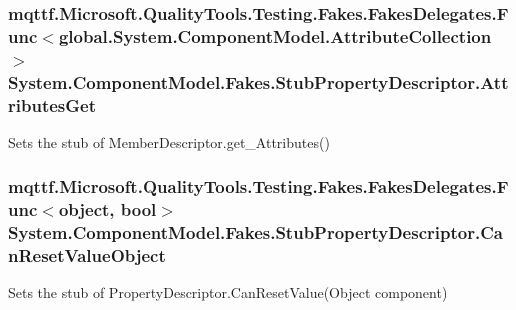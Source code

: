 \hypertarget{class_system_1_1_component_model_1_1_fakes_1_1_stub_property_descriptor_a8dfef55ee32a13c8420eb5f97480d707}{
\subsubsection[{Attributes\-Get}]{\setlength{\rightskip}{0pt plus 5cm}mqttf.\-Microsoft.\-Quality\-Tools.\-Testing.\-Fakes.\-Fakes\-Delegates.\-Func$<$global.\-System.\-Component\-Model.\-Attribute\-Collection$>$ System.\-Component\-Model.\-Fakes.\-Stub\-Property\-Descriptor.\-Attributes\-Get}}\label{class_system_1_1_component_model_1_1_fakes_1_1_stub_property_descriptor_a8dfef55ee32a13c8420eb5f97480d707}


Sets the stub of Member\-Descriptor.\-get\-\_\-\-Attributes()

\hypertarget{class_system_1_1_component_model_1_1_fakes_1_1_stub_property_descriptor_a311c8a31d4141634ee5f48063f267d21}{
\subsubsection[{Can\-Reset\-Value\-Object}]{\setlength{\rightskip}{0pt plus 5cm}mqttf.\-Microsoft.\-Quality\-Tools.\-Testing.\-Fakes.\-Fakes\-Delegates.\-Func$<$object, bool$>$ System.\-Component\-Model.\-Fakes.\-Stub\-Property\-Descriptor.\-Can\-Reset\-Value\-Object}}\label{class_system_1_1_component_model_1_1_fakes_1_1_stub_property_descriptor_a311c8a31d4141634ee5f48063f267d21}


Sets the stub of Property\-Descriptor.\-Can\-Reset\-Value(\-Object component)

